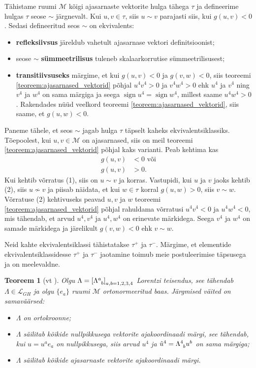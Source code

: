 \documentclass[12pt,a4paper,oneside]{article}
\theoremstyle{plain}
\newtheorem{teoreem}{Teoreem}[section]
\theoremstyle{definition}
\numberwithin{equation}{section}
\def\L{{\mathcal L}}
\def\M{{\mathcal M}}
\DeclareMathOperator{\sign}{sign}
\begin{document}
Tähistame ruumi $\M$ kõigi ajasarnaste vektorite hulga tähega $\tau$ 
ja defineerime hulgas $\tau$ seose $\sim$ järgnevalt. Kui 
$u,v \in \tau$, siis $u \sim v$ parajasti siis, kui 
$g\left(u,v\right) < 0$. Sedasi defineeritud seos $\sim$ on 
ekvivalents:
\begin{itemize}
\item[(a)] \textbf{refleksiivsus} järeldub vahetult ajasarnase 
	vektori definitsioonist;
\item[(b)] seose $\sim$ \textbf{sümmeetrilisus} tuleneb 
	skalaarkorrutise sümmeetrilisusest;
\item[(c)] \textbf{transitiivsuseks} märgime, et kui 
	$g\left(u,v\right) < 0$ ja $g\left(v, w\right) < 0$, siis 
	teoreemi \ref{teoreem:ajasarnased_vektorid} põhjal 
	$u^4 v^4 > 0$ ja $v^4 w^4 > 0$ ehk $u^4$ ja $v^4$ ning $v^4$ ja 
	$w^4$ on sama märgiga ja seega $\sign u^4 = \sign w^4$, millest 
	saame $u^4 w^4 > 0$. Rakendades nüüd veelkord teoreemi 
	\ref{teoreem:ajasarnased_vektorid}, siis saame, et 
	$g\left(u, w\right) < 0$.
\end{itemize}
Paneme tähele, et seos $\sim$ jagab hulga $\tau$ täpselt kaheks 
ekvivalentsiklassiks. Tõe\-poolest, kui $u, v \in \M$ on ajasarnased, 
siis on meil teoreemi \ref{teoreem:ajasarnased_vektorid} põhjal kaks 
varianti. Peab kehtima kas 
\begin{align}
g\left(u,v\right) &< 0 \text{ või} \tag{1} \\
g\left(u,v\right) &> 0. \tag{2}
\end{align}
Kui kehtib võrratus (1), siis on $u \sim v$ ja korras. Vastupidi, 
kui $u$ ja $v$ jaoks kehtib (2), siis $u \nsim v$ ja piisab näidata, 
et kui $w \in \tau$ korral $g\left(u,w\right) > 0$, siis $v \sim w$. 
Võrratuse (2) kehtivuseks peavad $u, v$ ja $w$ teoreemi 
\ref{teoreem:ajasarnased_vektorid} põhjal rahuldama võrratusi 
$u^4 v^4 < 0$ ja $u^4 w^4 < 0$, mis tähendab, et arvud $u^4, v^4$ ja 
$u^4, w^4$ on erinevate märkidega. Seega $v^4$ ja $w^4$ on samade 
märkidega ja järelikult $g\left(v,w\right) < 0$ ehk $v \sim w$.

Neid kahte ekvivalentsiklassi tähistatakse $\tau^+$ ja $\tau^-$. 
Märgime, et elementide ekvivalentsiklassidesse $\tau^+$ ja $\tau^-$ 
jaotamine toimub meie postuleerimise täpsusega ja on meelevaldne.

\begin{teoreem}[vt \textnormal{\cite[teoreem 1.3.3]{Naber}}]
Olgu $\Lambda = \left[\Lambda\indices{^a_b}\right]_{a,b = 1,2,3,4}$ 
Lorentzi teisendus, see tähendab $\Lambda \in \L_{GH}$ ja olgu 
$\{e_a\}$ ruumi $\M$ orto\-normeeritud baas. Järgmised 
väited on samaväärsed:
\begin{itemize}
\item[\emph{(i)}] $\Lambda$ on ortokroonne;
\item[\emph{(ii)}] $\Lambda$ säilitab kõikide nullpikkusega vektorite 
ajakoordinaadi märgi, see tähendab, kui $u = u^a e_a$ on 
nullpikkusega, siis arvud $u^4$ ja $\hat{u}^4 = 
\Lambda\indices{^4_b} u^b$ on sama märgiga;
\item[\emph{(iii)}] $\Lambda$ säilitab kõikide ajasarnaste vektorite 
ajakoordinaadi märgi.
\end{itemize}
\end{teoreem}
\end{document}
